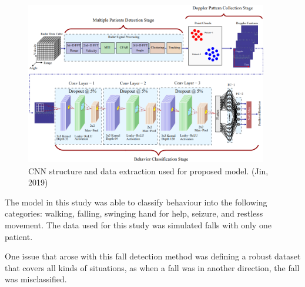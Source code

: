\begin{figure}[H]
    \centering
    \includegraphics[width=400px, height=270px]{conveee.png}
    \vspace{1ex}%
    \caption{CNN structure and data extraction used for proposed model. (Jin, 2019)}
    \label{fig:my_label}
\end{figure}

The model in this study was able to classify behaviour into the following categories: walking, falling, swinging hand for help, seizure, and restless movement. The data used for this study was simulated falls with only one patient. 

One issue that arose with this fall detection method was defining a robust dataset that covers all kinds of situations, as when a fall was in another direction, the fall was misclassified.  

